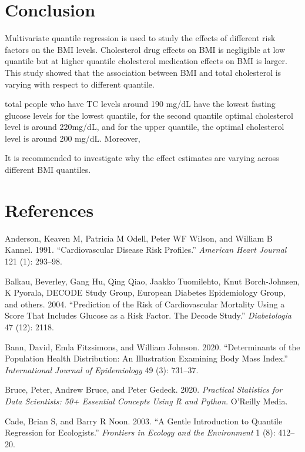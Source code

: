 \documentclass[
  12pt,
]{article}
\begin{document}
\section{Conclusion}

Multivariate quantile regression is used to study the effects of different risk factors on the BMI levels. Cholesterol drug effects on BMI is negligible at low quantile but at higher quantile cholesterol medication effects on BMI is larger. This study showed that the association between BMI and total cholesterol is varying with respect to different quantile.

total people who have TC levels around 190 mg/dL have the lowest fasting glucose levels for the lowest quantile, for the second quantile optimal cholesterol level is around 220mg/dL, and for the upper quantile, the optimal cholesterol level is around 200 mg/dL. Moreover,

It is recommended to investigate why the effect estimates are varying across different BMI quantiles.

\newpage
\section{References}

\hypertarget{refs}{}
\leavevmode\hypertarget{ref-anderson1991}{}%
Anderson, Keaven M, Patricia M Odell, Peter WF Wilson, and William B Kannel. 1991. ``Cardiovascular Disease Risk Profiles.'' \emph{American Heart Journal} 121 (1): 293--98.

\leavevmode\hypertarget{ref-balkau2004prediction}{}%
Balkau, Beverley, Gang Hu, Qing Qiao, Jaakko Tuomilehto, Knut Borch-Johnsen, K Pyorala, DECODE Study Group, European Diabetes Epidemiology Group, and others. 2004. ``Prediction of the Risk of Cardiovascular Mortality Using a Score That Includes Glucose as a Risk Factor. The Decode Study.'' \emph{Diabetologia} 47 (12): 2118.

\leavevmode\hypertarget{ref-bann2020}{}%
Bann, David, Emla Fitzsimons, and William Johnson. 2020. ``Determinants of the Population Health Distribution: An Illustration Examining Body Mass Index.'' \emph{International Journal of Epidemiology} 49 (3): 731--37.

\leavevmode\hypertarget{ref-bruce2020}{}%
Bruce, Peter, Andrew Bruce, and Peter Gedeck. 2020. \emph{Practical Statistics for Data Scientists: 50+ Essential Concepts Using R and Python}. O'Reilly Media.

\leavevmode\hypertarget{ref-cade2003}{}%
Cade, Brian S, and Barry R Noon. 2003. ``A Gentle Introduction to Quantile Regression for Ecologists.'' \emph{Frontiers in Ecology and the Environment} 1 (8): 412--20.
\end{document}
